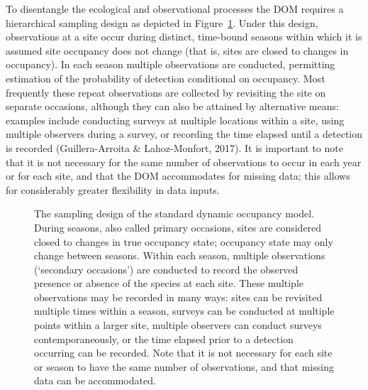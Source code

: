 \documentclass[
]{article}
\begin{document}
To disentangle the ecological and observational processes the DOM
requires a hierarchical sampling design as depicted in
Figure~\ref{fig-surveys}. Under this design, observations at a site
occur during distinct, time-bound seasons within which it is assumed
site occupancy does not change (that is, sites are closed to changes in
occupancy). In each season multiple observations are conducted,
permitting estimation of the probability of detection conditional on
occupancy. Most frequently these repeat observations are collected by
revisiting the site on separate occasions, although they can also be
attained by alternative means: examples include conducting surveys at
multiple locations within a site, using multiple observers during a
survey, or recording the time elapsed until a detection is recorded
(Guillera-Arroita \& Lahoz-Monfort, 2017). It is important to note that
it is not necessary for the same number of observations to occur in each
year or for each site, and that the DOM accommodates for missing data;
this allows for considerably greater flexibility in data inputs.

\begin{figure}


\caption{\label{fig-surveys}The sampling design of the standard dynamic
occupancy model. During seasons, also called primary occasions, sites
are considered closed to changes in true occupancy state; occupancy
state may only change between seasons. Within each season, multiple
observations (`secondary occasions') are conducted to record the
observed presence or absence of the species at each site. These multiple
observations may be recorded in many ways: sites can be revisited
multiple times within a season, surveys can be conducted at multiple
points within a larger site, multiple observers can conduct surveys
contemporaneously, or the time elapsed prior to a detection occurring
can be recorded. Note that it is not necessary for each site or season
to have the same number of observations, and that missing data can be
accommodated.}

\end{figure}%
\end{document}
